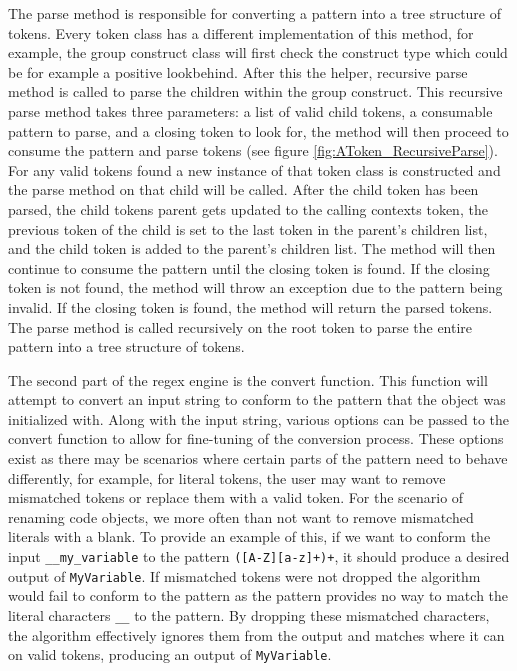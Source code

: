 The parse method is responsible for converting a pattern into a tree structure of tokens. Every token class has a different implementation of this method, for example, the group construct class will first check the construct type which could be for example a positive lookbehind. After this the helper, recursive parse method is called to parse the children within the group construct. This recursive parse method takes three parameters: a list of valid child tokens, a consumable pattern to parse, and a closing token to look for, the method will then proceed to consume the pattern and parse tokens (see figure \ref{fig:AToken_RecursiveParse}). For any valid tokens found a new instance of that token class is constructed and the parse method on that child will be called. After the child token has been parsed, the child tokens parent gets updated to the calling contexts token, the previous token of the child is set to the last token in the parent's children list, and the child token is added to the parent's children list. The method will then continue to consume the pattern until the closing token is found. If the closing token is not found, the method will throw an exception due to the pattern being invalid. If the closing token is found, the method will return the parsed tokens. The parse method is called recursively on the root token to parse the entire pattern into a tree structure of tokens.

The second part of the regex engine is the convert function. This function will attempt to convert an input string to conform to the pattern that the object was initialized with.
Along with the input string, various options can be passed to the convert function to allow for fine-tuning of the conversion process. These options exist as there may be scenarios where certain parts of the pattern need to behave differently, for example, for literal tokens, the user may want to remove mismatched tokens or replace them with a valid token.
For the scenario of renaming code objects, we more often than not want to remove mismatched literals with a blank. To provide an example of this, if we want to conform the input \texttt{\_\_my\_variable} to the pattern \texttt{([A-Z][a-z]+)+}, it should produce a desired output of \texttt{MyVariable}. If mismatched tokens were not dropped the algorithm would fail to conform to the pattern as the pattern provides no way to match the literal characters \texttt{\_\_} to the pattern. By dropping these mismatched characters, the algorithm effectively ignores them from the output and matches where it can on valid tokens, producing an output of \texttt{MyVariable}.

